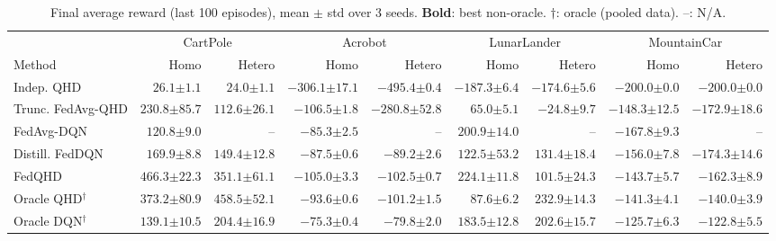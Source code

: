 \documentclass[sigconf,anonymous]{aamas}
\theoremstyle{plain}
\theoremstyle{definition}
\theoremstyle{remark}
\begin{document}
\begin{table}[t]
\centering
\caption{Final average reward (last 100 episodes), mean $\pm$ std over 3 seeds. \textbf{Bold}: best non-oracle. $\dagger$: oracle (pooled data). {--}: N/A.}
\label{tab:main_results_variance}
\setlength{\tabcolsep}{3pt}
\small
\begin{tabular}{l rr rr rr rr}
\toprule
& \multicolumn{2}{c}{CartPole} & \multicolumn{2}{c}{Acrobot} & \multicolumn{2}{c}{LunarLander} & \multicolumn{2}{c}{MountainCar} \\
\cmidrule(lr){2-3}\cmidrule(lr){4-5}\cmidrule(lr){6-7}\cmidrule(lr){8-9}
Method & Homo & Hetero & Homo & Hetero & Homo & Hetero & Homo & Hetero \\
\midrule
Indep. QHD
  & $26.1{\scriptstyle\pm1.1}$    & $24.0{\scriptstyle\pm1.1}$
  & $-306.1{\scriptstyle\pm17.1}$ & $-495.4{\scriptstyle\pm0.4}$
  & $-187.3{\scriptstyle\pm6.4}$  & $-174.6{\scriptstyle\pm5.6}$
  & $-200.0{\scriptstyle\pm0.0}$  & $-200.0{\scriptstyle\pm0.0}$ \\
Trunc. FedAvg-QHD
  & $230.8{\scriptstyle\pm85.7}$  & $112.6{\scriptstyle\pm26.1}$
  & $-106.5{\scriptstyle\pm1.8}$  & $-280.8{\scriptstyle\pm52.8}$
  & $65.0{\scriptstyle\pm5.1}$    & $-24.8{\scriptstyle\pm9.7}$
  & $-148.3{\scriptstyle\pm12.5}$ & $-172.9{\scriptstyle\pm18.6}$ \\
FedAvg-DQN
  & $120.8{\scriptstyle\pm9.0}$   & {--}
  & $\mathbf{-85.3{\scriptstyle\pm2.5}}$ & {--}
  & $200.9{\scriptstyle\pm14.0}$  & {--}
  & $-167.8{\scriptstyle\pm9.3}$  & {--} \\
Distill. FedDQN
  & $169.9{\scriptstyle\pm8.8}$   & $149.4{\scriptstyle\pm12.8}$
  & $-87.5{\scriptstyle\pm0.6}$   & $\mathbf{-89.2{\scriptstyle\pm2.6}}$
  & $122.5{\scriptstyle\pm53.2}$  & $\mathbf{131.4{\scriptstyle\pm18.4}}$
  & $-156.0{\scriptstyle\pm7.8}$  & $-174.3{\scriptstyle\pm14.6}$ \\
FedQHD
  & $\mathbf{466.3{\scriptstyle\pm22.3}}$ & $\mathbf{351.1{\scriptstyle\pm61.1}}$
  & $-105.0{\scriptstyle\pm3.3}$  & $-102.5{\scriptstyle\pm0.7}$
  & $\mathbf{224.1{\scriptstyle\pm11.8}}$ & $101.5{\scriptstyle\pm24.3}$
  & $\mathbf{-143.7{\scriptstyle\pm5.7}}$ & $\mathbf{-162.3{\scriptstyle\pm8.9}}$ \\
\midrule
Oracle QHD$^\dagger$
  & $373.2{\scriptstyle\pm80.9}$  & $458.5{\scriptstyle\pm52.1}$
  & $-93.6{\scriptstyle\pm0.6}$   & $-101.2{\scriptstyle\pm1.5}$
  & $87.6{\scriptstyle\pm6.2}$    & $232.9{\scriptstyle\pm14.3}$
  & $-141.3{\scriptstyle\pm4.1}$  & $-140.0{\scriptstyle\pm3.9}$ \\
Oracle DQN$^\dagger$
  & $139.1{\scriptstyle\pm10.5}$  & $204.4{\scriptstyle\pm16.9}$
  & $-75.3{\scriptstyle\pm0.4}$   & $-79.8{\scriptstyle\pm2.0}$
  & $183.5{\scriptstyle\pm12.8}$  & $202.6{\scriptstyle\pm15.7}$
  & $-125.7{\scriptstyle\pm6.3}$  & $-122.8{\scriptstyle\pm5.5}$ \\
\bottomrule
\end{tabular}
\end{table}
\end{document}
